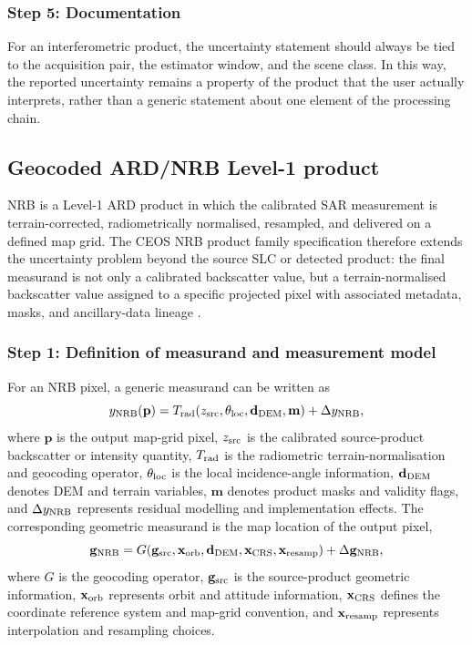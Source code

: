 \subsubsection{Step 5: Documentation}

For an interferometric product, the uncertainty statement should always be tied
to the acquisition pair, the estimator window, and the scene class. In this
way, the reported uncertainty remains a property of the product that the user
actually interprets, rather than a generic statement about one element of the
processing chain.



\subsection{Geocoded ARD/NRB Level-1 product}
\label{sec:l1_nrb_uncertainty}

\ac{NRB} is a Level-1 \ac{ARD} product in which the calibrated \ac{SAR}
measurement is terrain-corrected, radiometrically normalised, resampled, and
delivered on a defined map grid. The \ac{CEOS} \ac{NRB} product family specification
therefore extends the uncertainty problem beyond the source \ac{SLC} or detected
product: the final measurand is not only a calibrated backscatter value, but a
terrain-normalised backscatter value assigned to a specific projected pixel
with associated metadata, masks, and ancillary-data lineage \cite{NRB_PFS}.

\subsubsection{Step 1: Definition of measurand and measurement model}

For an \ac{NRB} pixel, a generic measurand can be written as
\begin{equation}
  y_{\rm NRB}(\mathbf{p}) =
  T_{\rm rad}\!\left(z_{\rm src}, \theta_{\rm loc}, \mathbf{d}_{\rm DEM}, \mathbf{m}\right)
  + \Delta y_{\rm NRB},
  \label{eq:nrb_model}
\end{equation}
where $\mathbf{p}$ is the output map-grid pixel, $z_{\rm src}$ is the calibrated source-product backscatter or intensity quantity, $T_{\rm rad}$ is the radiometric terrain-normalisation and geocoding operator, $\theta_{\rm loc}$ is the local incidence-angle information, $\mathbf{d}_{\rm DEM}$ denotes \ac{DEM} and terrain variables, $\mathbf{m}$ denotes product masks and validity flags, and $\Delta y_{\rm NRB}$ represents residual modelling and implementation effects. The corresponding geometric measurand is the map location of the output pixel,
\begin{equation}
  \mathbf{g}_{\rm NRB} = G\!\left(\mathbf{g}_{\rm src}, \mathbf{x}_{\rm orb}, \mathbf{d}_{\rm DEM}, \mathbf{x}_{\rm CRS}, \mathbf{x}_{\rm resamp}\right) + \Delta \mathbf{g}_{\rm NRB},
  \label{eq:nrb_geometric_model}
\end{equation}
where $G$ is the geocoding operator, $\mathbf{g}_{\rm src}$ is the source-product geometric information, $\mathbf{x}_{\rm orb}$ represents orbit and attitude information, $\mathbf{x}_{\rm CRS}$ defines the coordinate reference system and map-grid convention, and $\mathbf{x}_{\rm resamp}$ represents interpolation and resampling choices.


